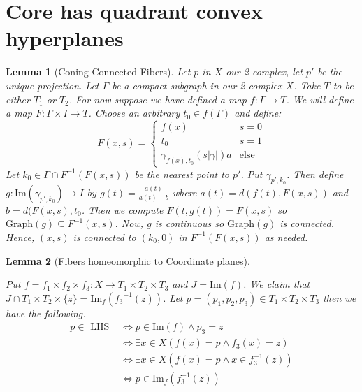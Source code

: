 \documentclass{article}
\theoremstyle{mystyle}
\newtheorem{lem}{Lemma}[section]
\theoremstyle{remark}
\begin{document}
\section{Core has quadrant convex hyperplanes}

\begin{lem}
    [Coning Connected Fibers]
    \label{lem:confib} 
    Let \(p\) in \(X\) our 2-complex, let \(p'\) be the unique projection. Let \(\Gamma\) be a compact subgraph in our 2-complex \(X\).  Take \(T\) to be either \(T_{1}\) or \(T_{2}\). For now suppose we have defined a map \(f: \Gamma \to T\). We will define a map \(F: \Gamma \times I \to T\). Choose an arbitrary \(t_{0} \in f(\Gamma) \) and define: 
    \[ F(x,s) = 
        \begin{cases} 
            f(x)& s=0\\ 
            t_{0} & s=1\\
            \gamma_{f(x),t_{0}} (s | \gamma |)a & \text{else}
        \end{cases}
    \]
    Let \(k_{0} \in \Gamma \cap F^{-1} (F(x,s))\) be the nearest point to \(p'\). Put \(\gamma_{p',k_{0}}\). Then define \(g: \text{Im} (\gamma_{p',k_{0}}) \to I\) by \(g(t) = \frac{a(t)}{a(t)+b}\) where \(a(t) = d(f(t), F(x,s))\) and \(b = d(F(x,s), t_{0}\). Then we compute \(F(t,g(t))=F(x,s)\) so \(\text{Graph}(g) \subseteq F^{-1} (x,s)\). Now, \(g\) is continuous so \(\text{Graph}(g)\) is connected. Hence, \((x,s)\) is connected to \((k_{0} ,0)\) in \(F^{-1} (F(x,s))\) as needed.
\end{lem}
\begin{lem}
    [Fibers homeomorphic to Coordinate planes]
 \label{lem:fibershomeoplanes} 


    Put \(f =  f_{1} \times f_{2} \times f_{3}: X \to T_{1} \times T_{2} \times T_{3} \) and \(J = \text{Im}(f)\). We claim that \(J \cap T_{1} \times T_{2} \times \{z\} = \text{Im}_{f} ({ f_{3}}^{-1}(z))\). Let \(p = (p_{1}, p_{2} , p_{3}) \in T_{1} \times T_{2} \times T_{3}\) then we have the following. 
    \begin{align*}
        p \in \text { LHS } & \Longleftrightarrow p \in \text{Im}(f) \wedge p_{3} = z \\ 
        & \Longleftrightarrow \exists x \in X (f(x)=p \wedge  f_3(x)=z)\\
        & \Longleftrightarrow \exists x \in X (f(x)=p \wedge x \in f_3^{-1} (z))\\
        & \Longleftrightarrow p \in \text{Im}_f(f_3^{-1} (z))
    \end{align*}
\end{lem}
\end{document}
